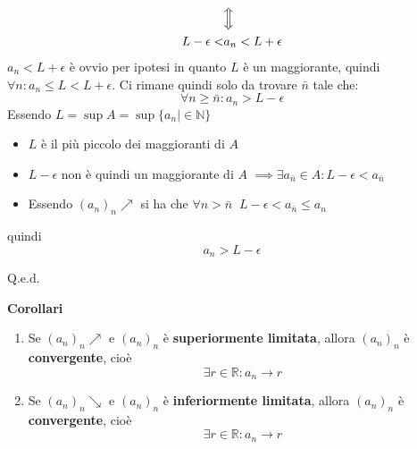 {\begin{enumerate}
\begin{align*}
            &\Big\Updownarrow\\
            L - \epsilon < &a_n < L + \epsilon
        \end{align*}
        $a_n < L + \epsilon$ è ovvio per ipotesi in quanto $L$ è un maggiorante, quindi $\forall n: a_n \leq L < L + \epsilon$. Ci rimane quindi solo da trovare $\bar{n}$ tale che:
        \begin{equation*}
            \forall n \geq \bar{n} : a_n > L - \epsilon
        \end{equation*}
        Essendo $L = \sup A = \sup \{a_n | \in \mathbb{N}\}$
        \begin{itemize}
            \item $L$ è il più piccolo dei maggioranti di $A$
            \item $L - \epsilon$ non è quindi un maggiorante di $A$ $\implies \exists a_{\bar{n}} \in A : L -\epsilon < a_{\bar{n}}$
            \item Essendo $(a_n)_n \nearrow$ si ha che $\forall n > \bar{n} \;\; L-\epsilon < a_{\bar{n}} \leq a_{n}$
        \end{itemize}
        quindi
        \begin{equation*}
            a_n > L - \epsilon
        \end{equation*}
        
        \hfill Q.e.d.
\end{enumerate}
}
\textbf{Corollari} \label{corollario_successioni}
\begin{enumerate}
    \item Se $(a_n)_n \nearrow$ e $(a_n)_n$ è \textbf{superiormente limitata}, allora $(a_n)_n$ è \textbf{convergente}, cioè
        \begin{equation*}
            \exists r \in \mathbb{R} : a_n \xrightarrow{\quad} r
        \end{equation*}
    \item Se $(a_n)_n \searrow$ e $(a_n)_n$ è \textbf{inferiormente limitata}, allora $(a_n)_n$ è \textbf{convergente}, cioè
        \begin{equation*}
            \exists r \in \mathbb{R} : a_n \xrightarrow{\quad} r
        \end{equation*}
\end{enumerate}